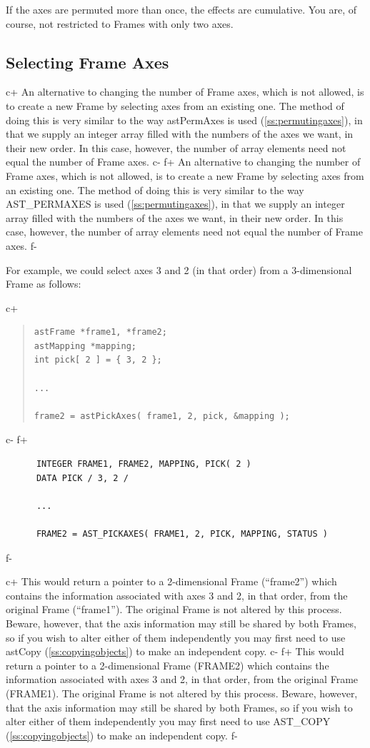 \documentclass[twoside,11pt]{article}
\newcommand{\secref}[1]{\S\ref{#1}}
\renewcommand{\secref}[1]{\ref{#1}}
\begin{document}
If the axes are permuted more than once, the effects are cumulative.
You are, of course, not restricted to Frames with only two axes.

\subsection{Selecting Frame Axes}

c+
An alternative to changing the number of Frame axes, which is not
allowed, is to create a new Frame by selecting axes from an existing
one. The method of doing this is very similar to the way astPermAxes
is used (\secref{ss:permutingaxes}), in that we supply an integer
array filled with the numbers of the axes we want, in their new
order. In this case, however, the number of array elements need not
equal the number of Frame axes.
c-
f+
An alternative to changing the number of Frame axes, which is not
allowed, is to create a new Frame by selecting axes from an existing
one. The method of doing this is very similar to the way AST\_PERMAXES
is used (\secref{ss:permutingaxes}), in that we supply an integer
array filled with the numbers of the axes we want, in their new
order. In this case, however, the number of array elements need not
equal the number of Frame axes.
f-

For example, we could select axes 3 and 2 (in that order) from a
3-dimensional Frame as follows:

c+
\begin{quote}
\small
\begin{verbatim}
astFrame *frame1, *frame2;
astMapping *mapping;
int pick[ 2 ] = { 3, 2 };

...

frame2 = astPickAxes( frame1, 2, pick, &mapping );
\end{verbatim}
\normalsize
\end{quote}
c-
f+
\small
\begin{verbatim}
      INTEGER FRAME1, FRAME2, MAPPING, PICK( 2 )
      DATA PICK / 3, 2 /

      ...

      FRAME2 = AST_PICKAXES( FRAME1, 2, PICK, MAPPING, STATUS )
\end{verbatim}
\normalsize
f-

c+
This would return a pointer to a 2-dimensional Frame (``frame2'')
which contains the information associated with axes 3 and 2, in that
order, from the original Frame (``frame1''). The original Frame is not
altered by this process. Beware, however, that the axis information
may still be shared by both Frames, so if you wish to alter either of
them independently you may first need to use astCopy
(\secref{ss:copyingobjects}) to make an independent copy.
c-
f+
This would return a pointer to a 2-dimensional Frame (FRAME2) which
contains the information associated with axes 3 and 2, in that order,
from the original Frame (FRAME1). The original Frame is not altered by
this process. Beware, however, that the axis information may still be
shared by both Frames, so if you wish to alter either of them
independently you may first need to use AST\_COPY
(\secref{ss:copyingobjects}) to make an independent copy.
f-
\end{document}
